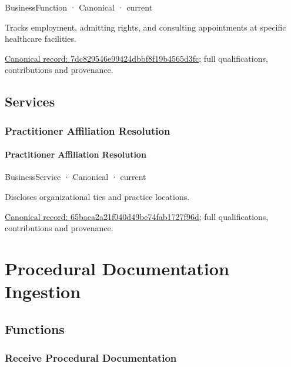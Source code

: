 \label{element:7dc829546e99424dbbf8f19b4565d3fc}
{\small BusinessFunction · Canonical · current}\par

Tracks employment, admitting rights, and consulting appointments at specific healthcare facilities.


{\footnotesize \href{../../../../continuum/business/business-function/7dc829546e99424dbbf8f19b4565d3fc.md}{Canonical record: 7dc829546e99424dbbf8f19b4565d3fc}; full qualifications, contributions and provenance.}\par
\subsection{Services}

\subsubsection{Practitioner Affiliation Resolution}

\paragraph{Practitioner Affiliation Resolution}

\label{element:65baca2a21f040d49be74fab1727f96d}
{\small BusinessService · Canonical · current}\par

Discloses organizational ties and practice locations.


{\footnotesize \href{../../../../continuum/business/business-service/65baca2a21f040d49be74fab1727f96d.md}{Canonical record: 65baca2a21f040d49be74fab1727f96d}; full qualifications, contributions and provenance.}\par
\section{Procedural Documentation Ingestion}

\subsection{Functions}

\subsubsection{Receive Procedural Documentation}

